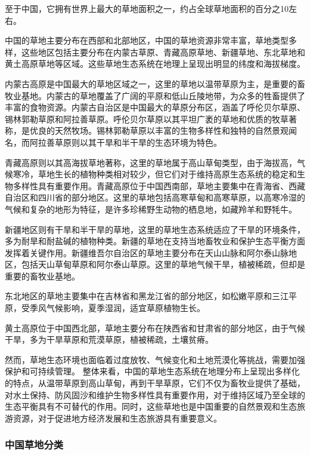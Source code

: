 \documentclass{article}
\begin{document}
	至于中国，它拥有世界上最大的草地面积之一，约占全球草地面积的百分之10左右。
	
	中国的草地主要分布在西部和北部地区，中国的草地资源非常丰富，草地类型多样，这些地区包括主要分布在内蒙古草原、青藏高原草地、新疆草地、东北草地和黄土高原草地等区域。这些草地生态系统在地理上呈现出明显的纬度和海拔梯度。
	
	内蒙古高原是中国最大的草地区域之一，这里的草地以温带草原为主，是重要的畜牧业基地。内蒙古的草地覆盖了广阔的平原和低山丘陵地带，为众多的牲畜提供了丰富的食物资源。内蒙古自治区是中国最大的草原分布区，涵盖了呼伦贝尔草原、锡林郭勒草原和阿拉善草原。呼伦贝尔草原以其平坦广袤的草地和优质的牧草著称，是优良的天然牧场。锡林郭勒草原以丰富的生物多样性和独特的自然景观闻名，而阿拉善草原则以其干旱和半干旱的生态环境为特色。
	
	青藏高原则以其高海拔草地著称，这里的草地属于高山草甸类型，由于海拔高，气候寒冷，草地生长的植物种类相对较少，但它们对于维持高原生态系统的稳定和生物多样性具有重要作用。青藏高原位于中国西南部，草地主要集中在青海省、西藏自治区和四川省的部分地区。这里的草地包括高寒草甸和高寒草原，以高寒冷湿的气候和复杂的地形为特征，是许多珍稀野生动物的栖息地，如藏羚羊和野牦牛。
	
	新疆地区则有干旱和半干旱的草地，这里的草地生态系统适应了干旱的环境条件，多为耐旱和耐盐碱的植物种类。新疆的草地在支持当地畜牧业和保护生态平衡方面发挥着关键作用。新疆维吾尔自治区的草地主要分布在天山山脉和阿尔泰山脉地区，包括天山草甸草原和阿尔泰山草原。这里的草地气候干旱，植被稀疏，但却是重要的畜牧业基地。
	
	东北地区的草地主要集中在吉林省和黑龙江省的部分地区，如松嫩平原和三江平原，受季风气候影响，夏季湿润，适宜草原植物生长。
	
	黄土高原位于中国西北部，草地主要分布在陕西省和甘肃省的部分地区，由于气候干旱，多为干旱草原和荒漠草原，植被稀疏，土壤贫瘠。
	
	然而，草地生态环境也面临着过度放牧、气候变化和土地荒漠化等挑战，需要加强保护和可持续管理。 整体来看，中国的草地生态系统在地理分布上呈现出多样化的特点，从温带草原到高山草甸，再到干旱草原，它们不仅为畜牧业提供了基础，对水土保持、防风固沙和维护生物多样性具有重要作用，对于维持区域乃至全球的生态平衡具有不可替代的作用。同时，这些草地也是中国重要的自然景观和生态旅游资源，对于促进地方经济发展和生态旅游具有重要意义。
	
	
		\subsubsection{中国草地分类}
		
\end{document}
